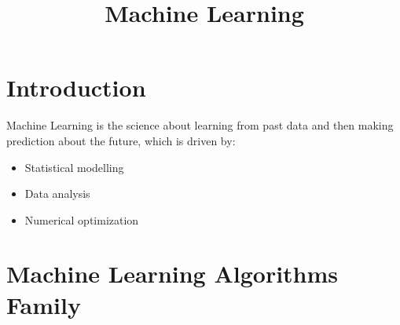 \documentclass[11pt]{article}
\title{Machine Learning}
\author{}
\date{}
\begin{document}
    \maketitle
    

    \section{Introduction}
        Machine Learning is the science about learning from past data and then making prediction about the future, which is driven by:
        \begin{itemize}
            \item Statistical modelling
            \item Data analysis
            \item Numerical optimization
        \end{itemize}
    

    \section{Machine Learning Algorithms Family}
\end{document}
